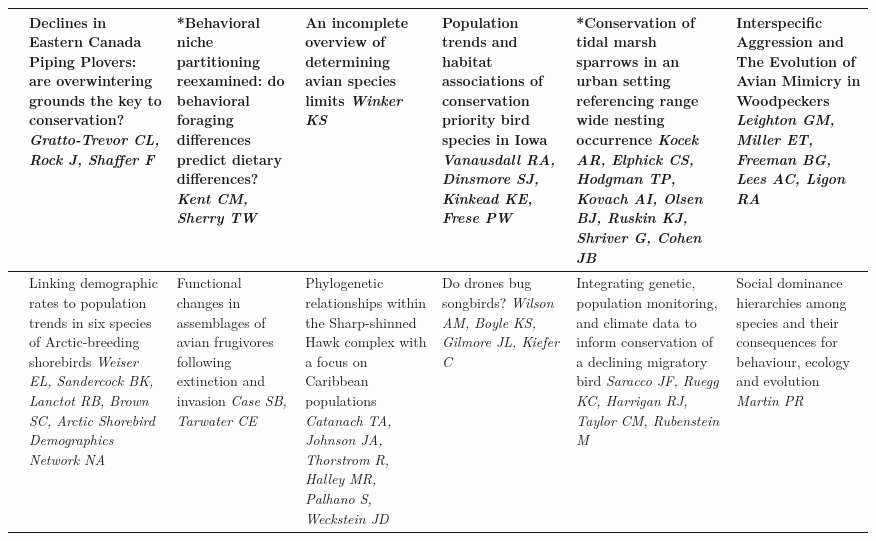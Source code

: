 \begin{tabular}{|x{0.75cm}|a{2.25cm}|x{2.25cm}|a{2.25cm}|x{2.25cm}|x{2.25cm}|a{2.25cm}|}
\hline
{}&Declines in Eastern Canada Piping Plovers: are overwintering grounds the key to conservation? \newline \newline \textit{Gratto-Trevor CL, Rock J, Shaffer F} & *Behavioral niche partitioning reexamined: do behavioral foraging differences predict dietary differences? \newline \newline \textit{Kent CM, Sherry TW} & An incomplete overview of determining avian species limits \newline \newline \textit{Winker KS} & Population trends and habitat associations of conservation priority bird species in Iowa \newline \newline \textit{Vanausdall RA, Dinsmore SJ, Kinkead KE, Frese PW} & *Conservation of tidal marsh sparrows in an urban setting referencing range wide nesting occurrence \newline \newline \textit{Kocek AR, Elphick CS, Hodgman TP, Kovach AI, Olsen BJ, Ruskin KJ, Shriver G, Cohen JB} & Interspecific Aggression and The Evolution of Avian Mimicry in Woodpeckers \newline \newline \textit{Leighton GM, Miller ET, Freeman BG, Lees AC, Ligon RA}\\
\hline
{}&Linking demographic rates to population trends in six species of Arctic-breeding shorebirds \newline \newline \textit{Weiser EL, Sandercock BK, Lanctot RB, Brown SC, Arctic Shorebird Demographics Network NA} & Functional changes in assemblages of avian frugivores following extinction and invasion \newline \newline \textit{Case SB, Tarwater CE} & Phylogenetic relationships within the Sharp-shinned Hawk complex with a focus on Caribbean populations \newline \newline \textit{Catanach TA, Johnson JA, Thorstrom R, Halley MR, Palhano S, Weckstein JD} & Do drones bug songbirds? \newline \newline \textit{Wilson AM, Boyle KS, Gilmore JL, Kiefer C} & Integrating genetic, population monitoring, and climate data to inform conservation of a declining migratory bird \newline \newline \textit{Saracco JF, Ruegg KC, Harrigan RJ, Taylor CM, Rubenstein M} & Social dominance hierarchies among species and their consequences for behaviour, ecology and evolution \newline \newline \textit{Martin PR}\\

\end{tabular}
